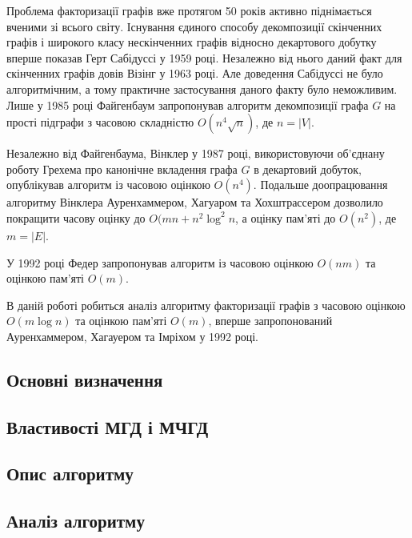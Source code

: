 Проблема факторизації графів вже протягом 50 років активно піднімається вченими зі всього світу.
Існування єдиного способу декомпозиції скінченних графів і широкого класу нескінченних графів відносно декартового добутку вперше показав Герт Сабідуссі у 1959 році\cite{sabidussi1959gm}.
Незалежно від нього даний факт для скінченних графів довів Візінг у 1963 році\cite{vizing1963cpf}.
Але доведення Сабідуссі не було алгоритмічним, а тому практичне застосування даного факту було неможливим.
Лише у 1985 році Файгенбаум запропонував алгоритм декомпозиції графа $G$ на прості підграфи з часовою складністю $O(n^4\sqrt n)$, де $n=\vert V \vert$\cite{feigenbaum1985ptafpfcpg}.

Незалежно від Файгенбаума, Вінклер у 1987 році, використовуючи об'єднану роботу Грехема про канонічне вкладення графа $G$ в декартовий добуток, опублікував алгоритм із часовою оцінкою $O(n^4)$.
Подальше доопрацювання алгоритму Вінклера Ауренхаммером, Хагуаром та Хох\-штрассером дозволило покращити часову оцінку до $O(mn+n^2\log^2n$, а оцінку пам'яті до $O(n^2)$, де $m=\vert E \vert$.

У 1992 році Федер запропонував алгоритм із часовою оцінкою $O(nm)$ та оцінкою пам'яті $O(m)$\cite{feder1992pgr}.

В даній роботі робиться аналіз алгоритму факторизації графів з часовою оцінкою $O(m\log n)$ та оцінкою пам'яті $O(m)$, вперше запропонований Ауренхаммером, Хагауером та Імріхом у 1992 році\cite{aurenhammer1992cgflce}.

\newpage
\subsection{Основні визначення}


\newpage
\subsection{Властивості МГД і МЧГД}


\newpage
\subsection{Опис алгоритму}


\newpage
\subsection{Аналіз алгоритму}

